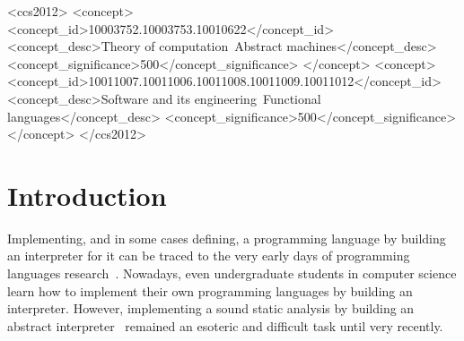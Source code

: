 \documentclass[acmsmall, screen]{acmart}\settopmatter{}
\begin{document}
\begin{CCSXML}
<ccs2012>
<concept>
<concept_id>10003752.10003753.10010622</concept_id>
<concept_desc>Theory of computation~Abstract machines</concept_desc>
<concept_significance>500</concept_significance>
</concept>
<concept>
<concept_id>10011007.10011006.10011008.10011009.10011012</concept_id>
<concept_desc>Software and its engineering~Functional languages</concept_desc>
<concept_significance>500</concept_significance>
</concept>
</ccs2012>
\end{CCSXML}





\maketitle


\section{Introduction}
\vspace{-0.7ex}

Implementing, and in some cases defining, a programming language by building an
interpreter for it can be traced to the very early days of programming languages
research~\cite{McCarthy:1960:RFS:367177.367199,landin1966next,Reynolds:72}.
Nowadays, even undergraduate students in computer science learn how to implement
their own programming languages by building an interpreter.
However, implementing a sound static analysis by building an
abstract interpreter~\cite{cousot1977abstract} remained an esoteric and difficult
task until very recently.
\end{document}
